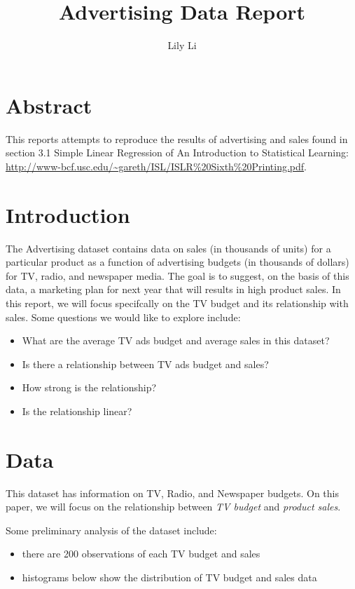 \documentclass{article}\usepackage[]{graphicx}\usepackage[]{color}
\begin{document}
\title{Advertising Data Report}
\author{Lily Li}
\maketitle

\section{Abstract}

This reports attempts to reproduce the results of advertising and sales found in section 3.1 Simple Linear Regression of An Introduction to Statistical Learning: \url{http://www-bcf.usc.edu/~gareth/ISL/ISLR%20Sixth%20Printing.pdf}.


\section{Introduction}

The Advertising dataset contains data on sales (in thousands of units) for a particular product as a function of advertising budgets (in thousands of dollars) for TV, radio, and newspaper media. The goal is to suggest, on the basis of this data, a marketing plan for next year that will results in high product sales. In this report, we will focus specifcally on the TV budget and its relationship with sales. Some questions we would like to explore include:

\begin{itemize}
\item What are the average TV ads budget and average sales in this dataset?
\item Is there a relationship between TV ads budget and sales?
\item How strong is the relationship?
\item Is the relationship linear?  
\end{itemize}


\section{Data}

This dataset has information on TV, Radio, and Newspaper budgets. On this paper, we will focus on the relationship between \emph{TV budget} and \emph{product sales}.  

Some preliminary analysis of the dataset include:  

\begin{itemize}
\item there are 200 observations of each TV budget and sales
\item histograms below show the distribution of TV budget and sales data
\end{itemize}
\end{document}
